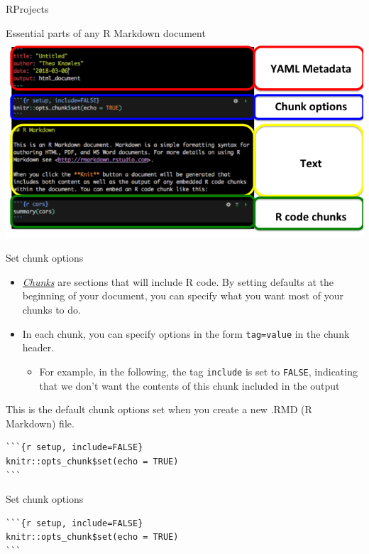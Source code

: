 \documentclass[
  ignorenonframetext,
]{beamer}
\providecommand{\tightlist}{%
  \setlength{\itemsep}{0pt}\setlength{\parskip}{0pt}}
\begin{document}
\begin{frame}[fragile]{RProjects}
\begin{block}{Essential parts of any R Markdown document}
\includegraphics{images/rmarkdown_parts.png}

\end{block}

\begin{block}{Set chunk options}

\begin{itemize}
\tightlist
\item
  \href{http://yihui.name/knitr/options/}{\emph{Chunks}} are sections
  that will include R code. By setting defaults at the beginning of your
  document, you can specify what you want most of your chunks to do.
\item
  In each chunk, you can specify options in the form \texttt{tag=value}
  in the chunk header.

  \begin{itemize}
  \tightlist
  \item
    For example, in the following, the tag \texttt{include} is set to
    \texttt{FALSE}, indicating that we don't want the contents of this
    chunk included in the output
  \end{itemize}
\end{itemize}

This is the default chunk options set when you create a new .RMD (R
Markdown) file.

\begin{verbatim}
```{r setup, include=FALSE}
knitr::opts_chunk$set(echo = TRUE)
```
\end{verbatim}

\end{block}

\begin{block}{Set chunk options}

\begin{verbatim}
```{r setup, include=FALSE}
knitr::opts_chunk$set(echo = TRUE)
```
\end{verbatim}


\end{block}
\end{frame}
\end{document}
